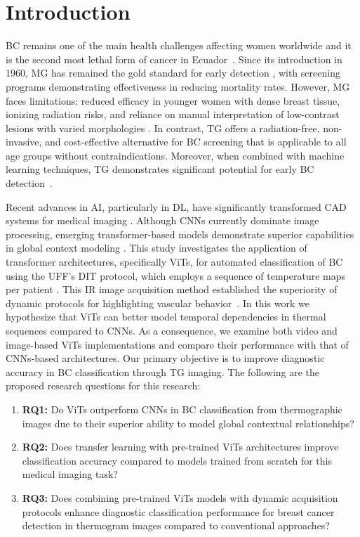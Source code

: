 \documentclass[runningheads]{llncs}
\begin{document}
\section{Introduction}
\label{sec:introduction}
\ac{BC} remains one of the main health challenges affecting women
worldwide and it is the second most lethal form of cancer in
Ecuador~\cite{GLOBOCAN}. Since its introduction in 1960, \ac{MG} has
remained the gold standard for early detection
\cite{Kennedy2009,tsietso2022review}, with screening programs
demonstrating effectiveness in reducing mortality rates. However,
\ac{MG} faces limitations: reduced efficacy in younger women with
dense breast tissue, ionizing radiation risks, and reliance on manual
interpretation of low-contrast lesions with varied morphologies
\cite{Liu2023,Su2022}. In contrast, \ac{TG} offers a radiation-free,
non-invasive, and cost-effective alternative for \ac{BC} screening
that is applicable to all age groups without
contraindications. Moreover, when combined with machine learning
techniques, \ac{TG} demonstrates significant potential for early BC
detection~\cite{Rakhunde2022}.

Recent advances in \ac{AI}, particularly in \ac{DL}, have
significantly transformed \ac{CAD} systems for medical imaging
\cite{Litjens2017}. Although \ac{CNNs} currently dominate image
processing, emerging transformer-based models demonstrate superior
capabilities in global context modeling
\cite{dosovitskiy2020image}. This study investigates the application
of transformer architectures, specifically \ac{ViTs}, for automated
classification of \ac{BC} using the UFF's \ac{DIT} protocol, which
employs a sequence of temperature maps per patient
\cite{VisualLab2014}. This \ac{IR} image acquisition method
established the superiority of dynamic protocols for highlighting
vascular behavior~\cite{Silva2014}. In this work we hypothesize that
\ac{ViTs} can better model temporal dependencies in thermal sequences
compared to \ac{CNNs}. As a consequence, we examine both video and
image-based \ac{ViTs} implementations and compare their performance
with that of \ac{CNNs}-based architectures. Our primary objective is
to improve diagnostic accuracy in \ac{BC} classification through
\ac{TG} imaging. The following are the proposed research questions
for this research:

\begin{enumerate}
\item \textbf{RQ1:} Do \ac{ViTs} outperform \ac{CNNs} in \ac{BC}
  classification from thermographic images due to their superior
  ability to model global contextual relationships?

\item \textbf{RQ2:} Does transfer learning with pre-trained \ac{ViTs}
  architectures improve classification accuracy compared to models
  trained from scratch for this medical imaging task?

\item \textbf{RQ3:} Does combining pre-trained \ac{ViTs} models with
  dynamic acquisition protocols enhance diagnostic classification
  performance for breast cancer detection in thermogram images
  compared to conventional approaches?
\end{enumerate}
\end{document}

